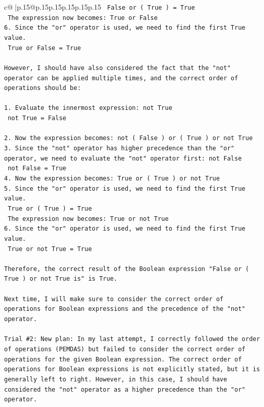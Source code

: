 \documentclass{article}
\begin{document}
{\begin{supertabular}{c@{$\;$}|p{.15\linewidth}@{}p{.15\linewidth}p{.15\linewidth}p{.15\linewidth}p{.15\linewidth}p{.15\linewidth}}
{{{\texttt{   False or ( True ) = True} \\
\texttt{   The expression now becomes: True or False} \\
\texttt{6. Since the "or" operator is used, we need to find the first True value. } \\
\texttt{   True or False = True} \\
\\ 
\texttt{However, I should have also considered the fact that the "not" operator can be applied multiple times, and the correct order of operations should be:} \\
\\ 
\texttt{1. Evaluate the innermost expression: not True} \\
\texttt{   not True = False} \\
\\ 
\texttt{2. Now the expression becomes: not ( False ) or ( True ) or not True} \\
\texttt{3. Since the "not" operator has higher precedence than the "or" operator, we need to evaluate the "not" operator first: not False} \\
\texttt{   not False = True} \\
\texttt{4. Now the expression becomes: True or ( True ) or not True} \\
\texttt{5. Since the "or" operator is used, we need to find the first True value. } \\
\texttt{   True or ( True ) = True} \\
\texttt{   The expression now becomes: True or not True} \\
\texttt{6. Since the "or" operator is used, we need to find the first True value. } \\
\texttt{   True or not True = True} \\
\\ 
\texttt{Therefore, the correct result of the Boolean expression "False or ( True ) or not True is" is True. } \\
\\ 
\texttt{Next time, I will make sure to consider the correct order of operations for Boolean expressions and the precedence of the "not" operator.} \\
\\ 
\texttt{Trial \#2: New plan: In my last attempt, I correctly followed the order of operations (PEMDAS) but failed to consider the correct order of operations for the given Boolean expression. The correct order of operations for Boolean expressions is not explicitly stated, but it is generally left to right. However, in this case, I should have considered the "not" operator as a higher precedence than the "or" operator. } \\
}}}
\end{supertabular}}
\end{document}
